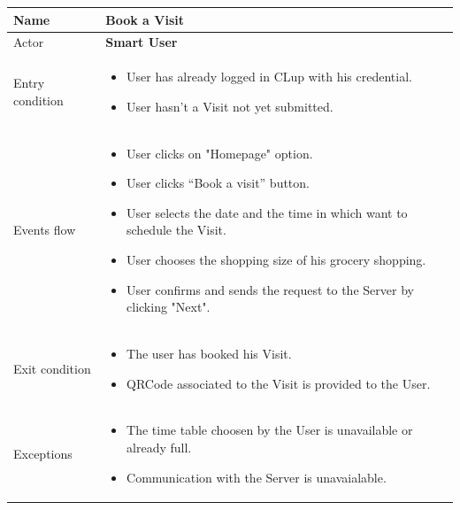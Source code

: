 \begin{tabular}{|p{5cm} | p{7cm} | }
	\hline
	Name & \textbf{Book a Visit} \\
	\hline
	Actor & \textbf{Smart User} \\
	\hline
	Entry condition &
	\begin{itemize}
		\item User has already logged in CLup with his credential.  
		\item User hasn't a Visit not yet submitted. 
	\end{itemize} \\
	\hline
	Events flow & 
	\begin{itemize}
		\item User clicks on "Homepage" option.
		\item User clicks “Book a visit” button.
		\item User selects the date and the time in which want to schedule the Visit.
		\item User chooses the shopping size of his grocery shopping.
		\item User confirms and sends the request to the Server by clicking "Next". 
	\end{itemize} \\
	\hline
	Exit condition & 	
    \begin{itemize}
    \item The user has booked his Visit.
    \item QRCode associated to the Visit is provided to the User. 
    \end{itemize}
 \\
	\hline 
	Exceptions & \begin{itemize}
		\item The time table choosen by the User is unavailable or already full.
        \item Communication with the Server is unavaialable.
	\end{itemize}  \\ 
	\hline
\end{tabular}

\par \medskip

